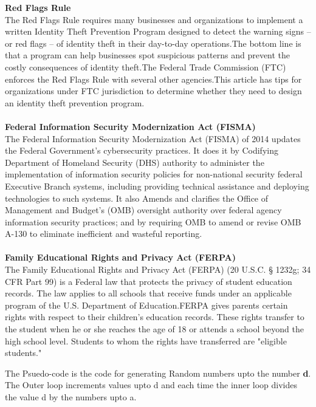 \documentclass[fleqn,letterpaper,12pt]{report}
\begin{document}
\assignmenttitle

%
{}
\problem
{\bf Red Flags Rule }\\
The Red Flags Rule requires many businesses and organizations to implement a written Identity Theft Prevention Program designed to detect the warning signs – or red flags – of identity theft in their day-to-day operations.The bottom line is that a program can help businesses spot suspicious patterns and prevent the costly consequences of identity theft.The Federal Trade Commission (FTC) enforces the Red Flags Rule with several other agencies.This article has tips for organizations under FTC jurisdiction to determine whether they need to design an identity theft prevention program.\cite{RF}\\
\\
{\bf Federal Information Security Modernization Act (FISMA)}\\
The Federal Information Security Modernization Act (FISMA) of 2014 updates the Federal Government's cybersecurity practices. It does it by Codifying Department of Homeland Security (DHS) authority to administer the implementation of information security policies for non-national security federal Executive Branch systems, including providing technical assistance and deploying technologies to such systems. It also 
Amends and clarifies the Office of Management and Budget's (OMB) oversight authority over federal agency information security practices; and by requiring OMB to amend or revise OMB A-130 to eliminate inefficient and wasteful reporting.\cite{FIMA}\\
\\
{\bf Family Educational Rights and Privacy Act (FERPA)}\\
The Family Educational Rights and Privacy Act (FERPA) (20 U.S.C. § 1232g; 34 CFR Part 99) is a Federal law that protects the privacy of student education records. The law applies to all schools that receive funds under an applicable program of the U.S. Department of Education.FERPA gives parents certain rights with respect to their children's education records. These rights transfer to the student when he or she reaches the age of 18 or attends a school beyond the high school level. Students to whom the rights have transferred are "eligible students."\cite{FE}




%
\newpage
{}
{}
\problem
The Psuedo-code is the code for generating Random numbers upto the number {\bf d}. The Outer loop increments values upto d and each time the inner loop divides the value d by the numbers upto a. 
\end{document}
